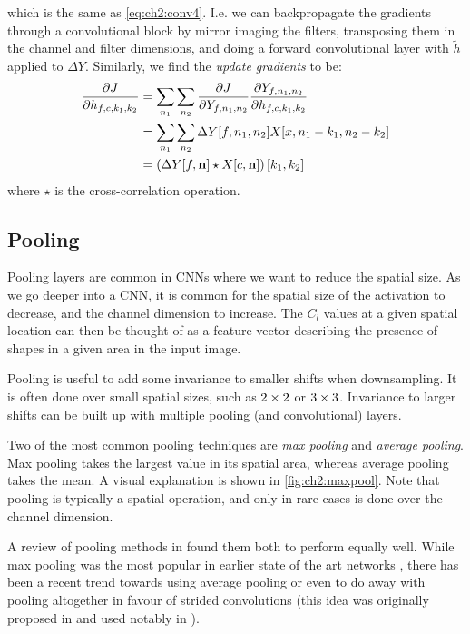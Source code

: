 which is the same as \eqref{eq:ch2:conv4}. I.e. we can backpropagate the
gradients through a convolutional block by mirror imaging the filters,
transposing them in the channel and filter dimensions, and doing a forward
convolutional layer with $\tilde{h}$ applied to $\Delta Y$. Similarly, we 
find the \emph{update gradients} to be:
\begin{align}
  \frac{\partial J}{\partial h_{f,c,k_1,k_2}} &= \sum_{n_1} \sum_{n_2} \frac{\partial J}{\partial Y_{f, n_1, n_2}} \frac{\partial Y_{f, n_1, n_2}}{\partial h_{f, c, k_1, k_2}} \\
                            &= \sum_{n_1} \sum_{n_2} \Delta Y[f, n_1, n_2] X[x, n_1-k_1, n_2-k_2 ] \\
                            &= \left(\Delta Y[f, \mathbf{n}] \star X[c, \mathbf{n}]\right)[k_1, k_2]
\end{align}
where $\star$ is the cross-correlation operation. 


\subsection{Pooling}
Pooling layers are common in CNNs where we want to reduce the spatial size. As
we go deeper into a CNN, it is common for the spatial size of the activation to
decrease, and the channel dimension to increase. The $C_l$ values at a given
spatial location can then be thought of as a feature vector describing the
presence of shapes in a given area in the input image.

Pooling is useful to add some invariance to smaller shifts when downsampling. It
is often done over small spatial sizes, such as $2\times 2$ or $3\times 3$. Invariance
to larger shifts can be built up with multiple pooling (and convolutional) layers.

Two of the most common pooling techniques are \emph{max pooling} and
\emph{average pooling}. Max pooling takes the largest value in its spatial area,
whereas average pooling takes the mean. A visual explanation is shown in 
\autoref{fig:ch2:maxpool}. Note that pooling is typically a spatial operation,
and only in rare cases is done over the channel dimension.

A review of pooling methods in \cite{mishkin_systematic_2016} found them both
to perform equally well. While max pooling was the most popular in earlier state
of the art networks \cite{krizhevsky_imagenet_2012, simonyan_very_2014},
there has been a recent trend towards using average pooling \cite{huang_densely_2017}
or even to do away with pooling altogether in favour of strided convolutions
(this idea was originally proposed in \cite{springenberg_striving_2014-3} and
used notably in \cite{he_deep_2016, xie_aggregated_2017,
zagoruyko_wide_2016-1}).
  
